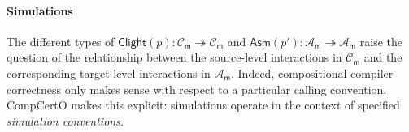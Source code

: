 \documentclass[acmsmall,screen,review,anonymous]{acmart}
\newcommand{\kw}[1]{\ensuremath{ \mathsf{#1} }}
\begin{document}

\paragraph{Simulations} %

The different types of
$\kw{Clight}(p) : \mathcal{C}_\kw{m} \twoheadrightarrow \mathcal{C}_\kw{m}$ and
$\kw{Asm}(p') : \mathcal{A}_\kw{m} \twoheadrightarrow \mathcal{A}_\kw{m}$
raise the question of the relationship
between the source-level interactions
in $\mathcal{C}_\kw{m}$
and the corresponding target-level interactions
in $\mathcal{A}_\kw{m}$.
Indeed,
compositional compiler correctness only makes sense
with respect to a particular calling convention.
CompCertO makes this explicit:
simulations operate in the context of specified
\emph{simulation conventions}.
\end{document}
